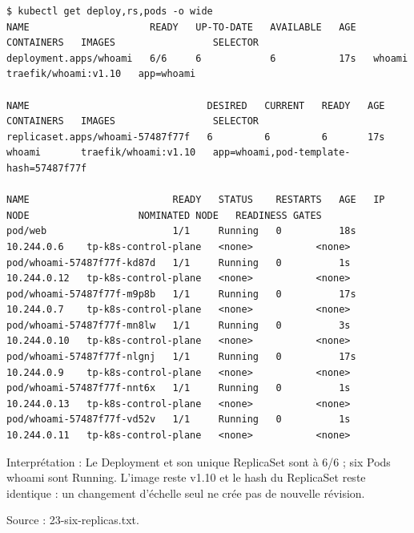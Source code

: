 \documentclass[11pt,a4paper]{article}
\begin{document}
\par\medskip\noindent\begin{minipage}{\linewidth}
\par\vspace{4pt}\noindent\begin{minipage}{\linewidth}
\begin{Verbatim}[breaklines=true,breakanywhere=true,fontsize=\footnotesize,frame=single,framesep=8pt,rulecolor=\color{teal}]
$ kubectl get deploy,rs,pods -o wide
NAME                     READY   UP-TO-DATE   AVAILABLE   AGE   CONTAINERS   IMAGES                 SELECTOR
deployment.apps/whoami   6/6     6            6           17s   whoami       traefik/whoami:v1.10   app=whoami

NAME                               DESIRED   CURRENT   READY   AGE   CONTAINERS   IMAGES                 SELECTOR
replicaset.apps/whoami-57487f77f   6         6         6       17s   whoami       traefik/whoami:v1.10   app=whoami,pod-template-hash=57487f77f

NAME                         READY   STATUS    RESTARTS   AGE   IP            NODE                   NOMINATED NODE   READINESS GATES
pod/web                      1/1     Running   0          18s   10.244.0.6    tp-k8s-control-plane   <none>           <none>
pod/whoami-57487f77f-kd87d   1/1     Running   0          1s    10.244.0.12   tp-k8s-control-plane   <none>           <none>
pod/whoami-57487f77f-m9p8b   1/1     Running   0          17s   10.244.0.7    tp-k8s-control-plane   <none>           <none>
pod/whoami-57487f77f-mn8lw   1/1     Running   0          3s    10.244.0.10   tp-k8s-control-plane   <none>           <none>
pod/whoami-57487f77f-nlgnj   1/1     Running   0          17s   10.244.0.9    tp-k8s-control-plane   <none>           <none>
pod/whoami-57487f77f-nnt6x   1/1     Running   0          1s    10.244.0.13   tp-k8s-control-plane   <none>           <none>
pod/whoami-57487f77f-vd52v   1/1     Running   0          1s    10.244.0.11   tp-k8s-control-plane   <none>           <none>
\end{Verbatim}
\end{minipage}\par\vspace{6pt}

Interprétation : Le Deployment et son unique ReplicaSet sont à 6/6 ; six Pods whoami sont Running. L'image reste v1.10 et le hash du ReplicaSet reste identique : un changement d'échelle seul ne crée pas de nouvelle révision.

{\footnotesize\color{teal} Source : 23-six-replicas.txt.\par}
\end{minipage}\par\medskip
\end{document}
